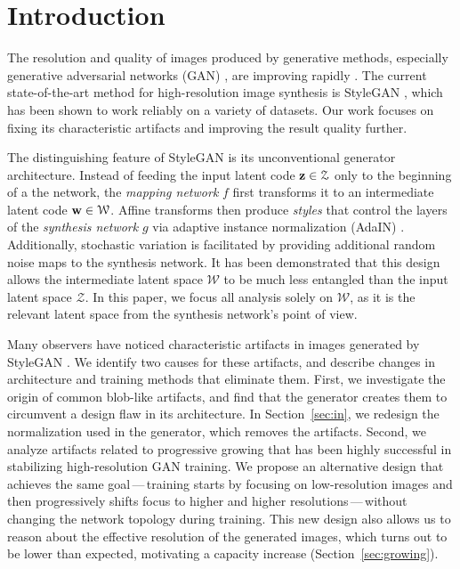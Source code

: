 \documentclass[10pt,twocolumn,letterpaper]{article}
\newcommand{\zz}{{\bf z}}
\newcommand{\ww}{{\bf w}}
\newcommand{\ZZ}{\mathcal{Z}}
\newcommand{\WW}{\mathcal{W}}
\begin{document}
\section{Introduction}

The resolution and quality of images produced by generative methods, especially generative adversarial networks (GAN) \cite{Goodfellow2014}, are improving rapidly \cite{Karras2017,Miyato2018B,Brock2018}. 
The current state-of-the-art method for high-resolution image synthesis is StyleGAN \cite{Karras2018}, which has been shown to work reliably on a variety of datasets. 
Our work focuses on fixing its characteristic artifacts and improving the result quality further.

The distinguishing feature of StyleGAN \cite{Karras2018} is its unconventional generator architecture. Instead of feeding the input latent code $\zz \in \ZZ$ only to the beginning of a the network, the \emph{mapping network} $f$ first transforms it to an intermediate latent code $\ww \in \WW$.
Affine transforms then produce \emph{styles} that control the layers of the \emph{synthesis network} $g$ via adaptive instance normalization (AdaIN) \cite{Huang2017,Dumoulin2016,Ghiasi2017,Dumoulin2018}.
Additionally, stochastic variation is facilitated by providing additional random noise maps to the synthesis network.
It has been demonstrated \cite{Karras2018,Shen2019} %
that this design allows the intermediate latent space $\WW$ to be much less entangled than the input latent space $\ZZ$.
In this paper, we focus all analysis solely on $\WW$, as it is the relevant latent space from the synthesis network's point of view.

\figdroplets %

Many observers have noticed characteristic artifacts in images generated by StyleGAN \cite{Bergstrom2019}. We identify two causes for these artifacts, and describe changes in architecture and training methods that eliminate them.
First, we investigate the origin of common blob-like artifacts, and find that the generator creates them to circumvent a design flaw in its architecture. 
In Section~\ref{sec:in}, we redesign the normalization used in the generator, which removes the artifacts.
Second, we analyze artifacts related to progressive growing \cite{Karras2017} that has been highly successful in stabilizing high-resolution GAN training.
We propose an alternative design that achieves the same goal\,---\,training starts by focusing on
low-resolution images and then progressively shifts focus to higher and higher resolutions\,---\,without changing the network topology during training.
This new design also allows us to reason about the effective resolution of the generated images, which turns out to be lower than expected, motivating a capacity increase (Section~\ref{sec:growing}).
\end{document}
